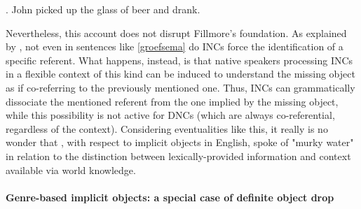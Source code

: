
\ex. \label{groefsema} John picked up the glass of beer and drank.

Nevertheless, this account does not disrupt Fillmore's foundation. As explained by \textcite[527]{Eu2018}, not even in sentences like \ref{groefsema} do INCs force the identification of a specific referent. What happens, instead, is that native speakers processing INCs in a flexible context of this kind can be induced to understand the missing object as if co-referring to the previously mentioned one. Thus, INCs can grammatically dissociate the mentioned referent from the one implied by the missing object, while this possibility is not active for DNCs (which are always co-referential, regardless of the context). Considering eventualities like this, it really is no wonder that \textcite[110]{Cote1996}, with respect to implicit objects in English, spoke of "murky water" in relation to the distinction between lexically-provided information and context available via world knowledge.



\paragraph{Genre-based implicit objects: a special case of definite object drop} 

